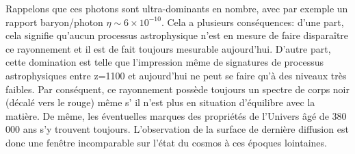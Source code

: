 Rappelons que ces photons sont ultra-dominants en nombre, avec par exemple un rapport baryon/photon $\eta\sim6\times 10^{-10}$. Cela a plusieurs conséquences: d'une part, cela signifie qu'aucun processus astrophysique n'est en mesure de faire disparaître ce rayonnement et il est de fait toujours mesurable aujourd'hui. D'autre part, cette domination est telle que l'impression même de signatures de processus astrophysiques entre z=1100 et aujourd'hui ne peut se faire qu'à des niveaux très faibles. Par conséquent, ce rayonnement possède toujours un spectre de corps noir (décalé vers le rouge) même s’ il n'est plus en situation d'équilibre avec la matière. De même, les éventuelles marques des propriétés de l'Univers âgé de 380 000 ans s'y trouvent toujours. L'observation de la surface de dernière diffusion est donc une fenêtre incomparable sur l'état du cosmos à ces époques lointaines.




